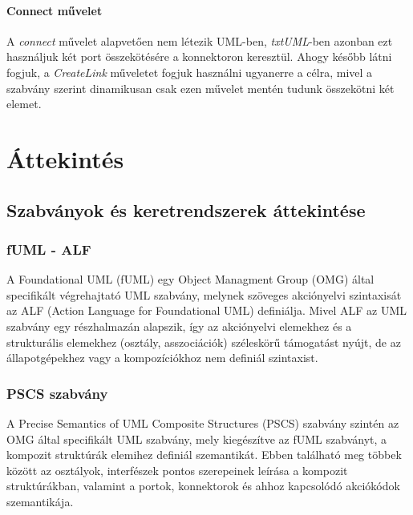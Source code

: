 \documentclass[a4paper,12pt]{report}
\begin{document}
\subsubsection{Connect művelet}
A \textit{connect} művelet alapvetően nem létezik UML-ben, \textit{txtUML}-ben azonban ezt használjuk két port összekötésére a konnektoron keresztül. Ahogy később látni fogjuk, a \textit{CreateLink} műveletet fogjuk használni ugyanerre a célra, mivel a szabvány szerint dinamikusan csak ezen művelet mentén tudunk összekötni két elemet.
\chapter{Áttekintés}

\section{Szabványok és keretrendszerek áttekintése}
\subsection{fUML - ALF}
A Foundational UML (fUML) \cite{fmul} egy Object Managment Group (OMG) által specifikált végrehajtató UML szabvány, 
melynek szöveges akciónyelvi szintaxisát az ALF (Action Language for Foundational UML) \cite{alf} definiálja.
Mivel ALF az UML szabvány egy részhalmazán alapszik, így az akciónyelvi elemekhez és a strukturális elemekhez (osztály, asszociációk)  széleskörű támogatást nyújt, de az állapotgépekhez vagy a kompozíciókhoz nem definiál szintaxist.

\subsection{PSCS szabvány}
A  Precise Semantics of UML Composite Structures (PSCS)  szabvány \cite{pscs} szintén az OMG által specifikált UML szabvány, mely kiegészítve az fUML szabványt, a kompozit struktúrák elemihez definiál szemantikát. Ebben található meg többek között az osztályok, interfészek pontos szerepeinek leírása a kompozit struktúrákban, valamint a portok, konnektorok és ahhoz kapcsolódó akciókódok szemantikája. 
\end{document}
